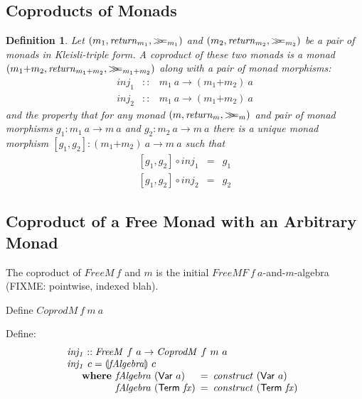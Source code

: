 \documentclass{jfp1}
\newcommand{\fold}[1]{\llparenthesis #1 \rrparenthesis}
\newcommand{\mbind}{\mathrel{>\kern-0.45em>\kern-0.45em=}}
\newtheorem{definition}{Definition}
\newcommand{\kw}[1]{\textbf{#1}}
\begin{document}
\subsection{Coproducts of Monads}

\newcommand{\cprd}[2]{#1\mathord{+}#2}

\begin{definition}
  Let $(m_1, \mathit{return}_{m_1}, \mbind_{m_1})$ and $(m_2,
  \mathit{return}_{m_2}, \mbind_{m_2})$ be a pair of monads in
  Kleisli-triple form. A \emph{coproduct} of these two monads is a
  monad $(\cprd{m_1}{m_2}, \mathit{return}_{\cprd{m_1}{m_2}},
  \mbind_{\cprd{m_1}{m_2}})$ along with a pair of monad morphisms:
  \begin{displaymath}
    \begin{array}{rcl}
      \mathit{inj}_1 & :: & m_1~a \to (\cprd{m_1}{m_2})~a \\
      \mathit{inj}_2 & :: & m_1~a \to (\cprd{m_1}{m_2})~a
    \end{array}
  \end{displaymath}
  and the property that for any monad $(m,\mathit{return}_m,
  \mbind_m)$ and pair of monad morphisms $g_1 : m_1~a \to m~a$ and
  $g_2 : m_2~a \to m~a$ there is a \emph{unique} monad morphism $[g_1,g_2] :
  (\cprd{m_1}{m_2})~a \to m~a$ such that
  \begin{displaymath}
    \begin{array}{rcl}
      {}[g_1,g_2] \circ \mathit{inj}_1 & = & g_1 \\
      {}[g_1,g_2] \circ \mathit{inj}_2 & = & g_2
    \end{array}
  \end{displaymath}
\end{definition}

\subsection{Coproduct of a Free Monad with an Arbitrary Monad}

The coproduct of $\mathit{FreeM}~f$ and $m$ is the initial
$\mathit{FreeMF}~f~a$-and-$m$-algebra (FIXME: pointwise, indexed blah).

Define $\mathit{CoprodM}~f~m~a$

Define:
\begin{displaymath}
  \begin{array}{l}
  \mathit{inj_1} :: \mathit{FreeM}~f~a \to \mathit{CoprodM}~f~m~a \\
  \mathit{inj_1}~c = \fold{\mathit{fAlgebra}}~c \\
  \quad\begin{array}{r@{\hspace{0.4em}}l@{\hspace{0.5em}}c@{\hspace{0.5em}}l}
    \kw{where}&\mathit{fAlgebra}~(\mathsf{Var}~a) &=& \mathit{construct}~(\mathsf{Var}~a) \\
    &\mathit{fAlgebra}~(\mathsf{Term}~\mathit{fx}) &=& \mathit{construct}~(\mathsf{Term}~\mathit{fx})
  \end{array}
\end{array}
\end{displaymath}
\end{document}
